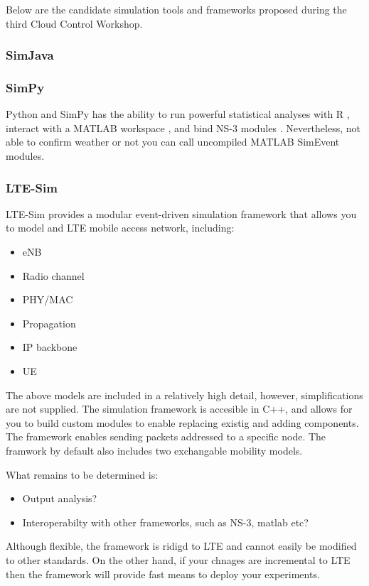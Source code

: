 Below are the candidate simulation tools and frameworks proposed during the third Cloud Control Workshop. \cite{zhao2012modeling}

\subsubsection{SimJava}


\subsubsection{SimPy}
Python and SimPy has the ability to run powerful statistical analyses with R \cite{rproject}, interact with a MATLAB workspace \cite{pymatlab}, and bind NS-3 modules \cite{ns3python}. Nevertheless, not able to confirm weather or not you can call uncompiled MATLAB SimEvent modules.


\subsubsection{LTE-Sim}
LTE-Sim \cite{5634134} provides a modular event-driven simulation framework that allows you to model and LTE mobile access network, including:

\begin{itemize}
\item eNB
\item Radio channel
\item PHY/MAC
\item Propagation
\item IP backbone
\item UE
\end{itemize}

The above models are included in a relatively high detail, however, simplifications are not supplied. The simulation framework is accesible in C++, and allows for you to build custom modules to enable replacing existig and adding components. The framework enables sending packets addressed to a specific node. The framwork by default also includes two exchangable mobility models.

What remains to be determined is:

\begin{itemize}
\item Output analysis?
\item Interoperabilty with other frameworks, such as NS-3, matlab etc?
\end{itemize}

Although flexible, the framework is ridigd to LTE and cannot easily be modified to other standards. On the other hand, if your chnages are incremental to LTE then the framework will provide fast means to deploy your experiments.



